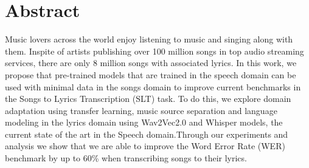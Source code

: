 \chapter*{\centering Abstract}


    Music lovers across the world enjoy listening to music and singing along with them. Inspite of artists publishing over 100 million songs in top audio streaming services, there are only 8 million songs with associated lyrics. In this work, we propose that pre-trained models that are trained in the speech domain can be used with minimal data in the songs domain to improve current benchmarks in the Songs to Lyrics Transcription (SLT) task. To do this, we explore domain adaptation using transfer learning, music source separation and language modeling in the lyrics domain using Wav2Vec2.0 and Whisper models, the current state of the art in the Speech domain.Through our experiments and analysis we show that we are able to improve the Word Error Rate (WER) benchmark by up to 60\% when transcribing songs to their lyrics.
    
